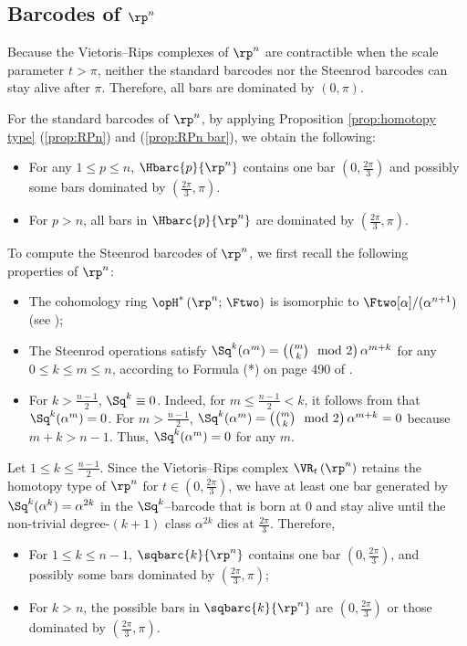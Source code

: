 \subsection{Barcodes of $\rp^n$}

Because the Vietoris--Rips complexes of $\rp^n$ are contractible when the scale parameter $t>\pi$, neither the standard barcodes nor the Steenrod barcodes can stay alive after $\pi$. Therefore, all bars are dominated by $(0,\pi)$.

For the standard barcodes of $\rp^n$, by applying Proposition \ref{prop:homotopy type} (\ref{prop:RPn}) and (\ref{prop:RPn bar}), %
we obtain the following:
\begin{itemize}
	\item For any $1 \leq p \leq n$, $\Hbarc{p}{\rp^n}$ contains one bar $\left(0,\frac{2\pi}{3}\right)$ and possibly some bars  dominated by $\left(\frac{2\pi}{3}, \pi\right)$.
	\item For $p>n$, all bars in $\Hbarc{p}{\rp^n}$ are dominated by $\left(\frac{2\pi}{3},\pi\right)$.
\end{itemize}

To compute the Steenrod barcodes of $\rp^n$, we first recall the following properties of $\rp^n$:
\begin{itemize}
	\item The cohomology ring $\opH^*\left(\rp^n;\,\Ftwo\right)$ is isomorphic to $\Ftwo[\alpha]/(\alpha^{n+1})$ (see \cite[Theorem 3.19]{hatcher2000});
	\item The Steenrod operations satisfy $\Sq^k(\alpha^m)=\left({m \choose k} \mod 2\right)\alpha^{m+k}$ for any $0\leq k\leq m\leq n$, according to Formula (*) on page 490 of \cite{hatcher2000}.
	\item For $k>\frac{n-1}{2}$, $\Sq^k\equiv 0$. Indeed, for $m\leq \frac{n-1}{2}<k$, it follows from \cite[page 489, Item (5)]{hatcher2000} that $\Sq^k(\alpha^m)=0$. For $m> \frac{n-1}{2}$, $\Sq^k(\alpha^m)=\left({m \choose k} \mod 2\right)\alpha^{m+k}=0$ because $m+k>n-1.$ Thus, $\Sq^k(\alpha^m)=0$ for any $m$.
\end{itemize}

Let $1 \leq k \leq \frac{n-1}{2}$.
Since the Vietoris--Rips complex $\VR_t\left(\rp^n\right)$ retains the homotopy type of $\rp^n$ for $t\in \left(0,\frac{2\pi}{3}\right)$, we have at least one bar generated by $\Sq^k(\alpha^k)=\alpha^{2k}$ in the $\Sq^k$--barcode that is born at $0$ and stay alive until the non-trivial degree-$(k+1)$ class $\alpha^{2k}$ dies at $\frac{2\pi}{3}$. Therefore,
\begin{itemize}
	\item For $1\leq k\leq n-1$, $\sqbarc{k}{\rp^n}$ contains one bar $\left(0,\frac{2\pi}{3}\right)$, and possibly some bars dominated by $\left(\frac{2\pi}{3},\pi\right)$;
	\item For $k>n$, the possible bars in $\sqbarc{k}{\rp^n}$ are $\left(0,\frac{2\pi}{3}\right)$ or those dominated by $\left(\frac{2\pi}{3},\pi\right)$.
\end{itemize}


